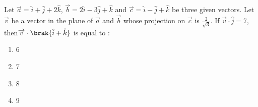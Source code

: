 \iffalse
\title{Assignment 3}
\author{AI24BTECH11018}
\section{mcq-single}
\fi

    \item[1.] Let $\overrightarrow{a}=\hat{i}+\hat{j}+2\hat{k}$, $\overrightarrow{b}=2\hat{i}-3\hat{j}+\hat{k}$ and $\overrightarrow{c}=\hat{i}-\hat{j}+\hat{k}$ be three given vectors. Let $\overrightarrow{v}$ be a vector in the plane of $\overrightarrow{a}$ and $\overrightarrow{b}$ whose projection on $\overrightarrow{c}$ is $\frac{2}{\sqrt{3}}$. If $\overrightarrow{v}\cdot\hat{j}=7$, then$\overrightarrow{v}\cdot\brak{\hat{i}+\hat{k}}$ is equal to :
    \hfill{}
    \begin{enumerate}
        \item 6
        \item 7
        \item 8
        \item 9
    \end{enumerate}
    
